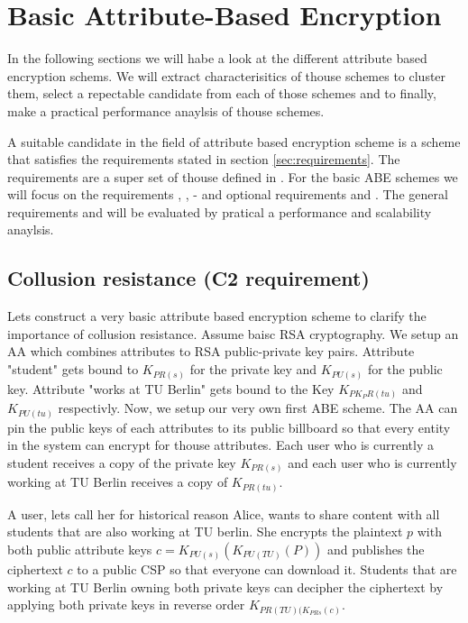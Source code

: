 \section{Basic Attribute-Based Encryption}
In the following sections we will habe a look at the different attribute based encryption schems. We will extract characterisitics of thouse schemes to cluster them, select a repectable candidate from each of those schemes and to finally, make a practical performance anaylsis of thouse schemes. 

A suitable candidate in the field of attribute based encryption scheme is a scheme that satisfies the requirements stated in section \ref{sec:requirements}. The requirements are a super set of thouse defined in \cite{lee2013survey}. For the basic ABE schemes we will focus on the requirements , ,  -  and optional requirements  and .
The general requirements  and  will be evaluated by pratical a performance and scalability anaylsis.

\subsection{Collusion resistance (C2 requirement)}
Lets construct a very basic attribute based encryption scheme to clarify the importance of collusion resistance. Assume baisc RSA cryptography. We setup an AA which combines attributes to RSA public-private key pairs. Attribute "student" gets bound to $K_{PR(s)}$ for the private key and $K_{PU(s)}$ for the public key. Attribute "works at TU Berlin" gets bound to the Key $K_{PK_PR(tu)}$ and $K_{PU(tu)}$ respectivly. Now, we setup our very own first ABE scheme. The AA can pin the public keys of each attributes to its public billboard so that every entity in the system can encrypt for thouse attributes. Each user who is currently a student receives a copy of the private key $K_{PR(s)}$ and each user who is currently working at TU Berlin receives a copy of $K_{PR(tu)}$. 

A user, lets call her for historical reason Alice, wants to share content with all students that are also working at TU berlin. She encrypts the plaintext $p$ with both public attribute keys $c = K_{PU(s)}(K_{PU(TU)}(P))$ and publishes the ciphertext $c$ to a public CSP so that everyone can download it. Students that are working at TU Berlin owning both private keys can decipher the ciphertext by applying both private keys in reverse order $K_{PR(TU)(K_{PR{s}}(c)}$.

